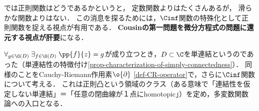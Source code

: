 \documentclass[uplatex, dvipdfmx]{jsreport}
\begin{document}
\begin{tcolorbox}[colframe=ForestGreen, colback=ForestGreen!10!white,breakable,colbacktitle=ForestGreen!40!white,coltitle=black,fonttitle=\bfseries\sffamily,
title=Cousinの第一問題を偏微分方程式の解の存在問題に帰着する]
    では正則関数はどうであるかというと，
    定数関数よりはたくさんあるが，
    滑らかな関数よりはない．
    この消息を探るためには，$\Cinf$関数の特殊化として正則関数を捉える視点が有用である．
    \textbf{Cousinの第一問題を微分方程式の問題に還元する視点が肝要}になる．

    $\forall_{g\in\O(D)}\;\exists_{f\in\O(D)}\;\pp{f}{z}=g$が成り立つとき，$D\subset\C$を単連結というのであった（単連結性の特徴付け\ref{prop-characterization-of-simply-connectedness}）．
    同様のことをCauchy-Riemann作用素$\o{\partial}$ \ref{def-CR-operator}で，さらに$\Cinf$関数について考える．
    これは正則凸という領域のクラス（ある意味で「連結性を仮定しない単連結」＝「任意の閉曲線が１点にhomotopic」）を定め，多変数関数論への入口となる．
\end{tcolorbox}
\end{document}
